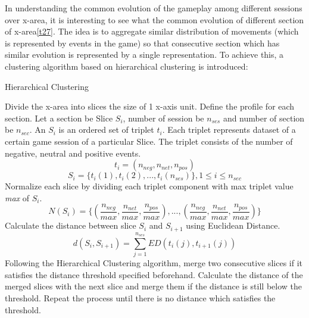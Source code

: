 In understanding the common evolution of the gameplay among different sessions over x-area, it is interesting to see what the common evolution of different section of x-area\ref{t27}. The idea is to aggregate similar distribution of movements (which is represented by events in the game) so that consecutive section which has similar evolution is represented by a single representation. To achieve this, a clustering algorithm based on hierarchical clustering is introduced:
\begin{algorithm}
  \caption{Hierarchical Clustering}\label{alg:Clustering}
  \begin{algorithmic}[1]
  \STATE Divide the x-area into slices the size of 1 x-axis unit.
  \STATE Define the profile for each section. Let a section be Slice $\textit{S}_i$, number of session be $n_{ses}$ and number of section be $n_{sec}$. An $\textit{S}_i$ is an ordered set of triplet $\textit{t}_i$. Each triplet represents dataset of a certain game session of a particular Slice. The triplet consists of the number of negative, neutral and positive events.
$$\textit{t}_i = (n_{neg}, n_{net}, n_{pos})$$
$$\textit{S}_i = \{\textit{t}_i(1), \textit{t}_i(2), ..., \textit{t}_i(n_{ses})\}, 1\le i\le n_{sec}$$
  \STATE Normalize each slice by dividing each triplet component with max triplet value \textit{max} of $\textit{S}_i$.
$$ \textit{N}(\textit{S}_i) = \{(\frac{n_{neg}}{\textit{max}}, \frac{n_{net}}{\textit{max}}, \frac{n_{pos}}{\textit{max}}),...,(\frac{n_{neg}}{\textit{max}}, \frac{n_{net}}{\textit{max}}, \frac{n_{pos}}{\textit{max}})\}$$
  \STATE Calculate the distance between slice $\textit{S}_i$ and $\textit{S}_{i+1}$ using Euclidean Distance.
$$ d(\textit{S}_i,\textit{S}_{i+1}) = \displaystyle\sum_{j=1}^{n_{ses}} ED(\textit{t}_i (j), \textit{t}_{i+1} (j))$$
  \STATE Following the Hierarchical Clustering algorithm\cite{maimon}, merge two consecutive slices if it satisfies the distance threshold specified beforehand. Calculate the distance of the merged slices with the next slice and merge them if the distance is still below the threshold. Repeat the process until there is no distance which satisfies the threshold.


  \end{algorithmic}
\end{algorithm} 

